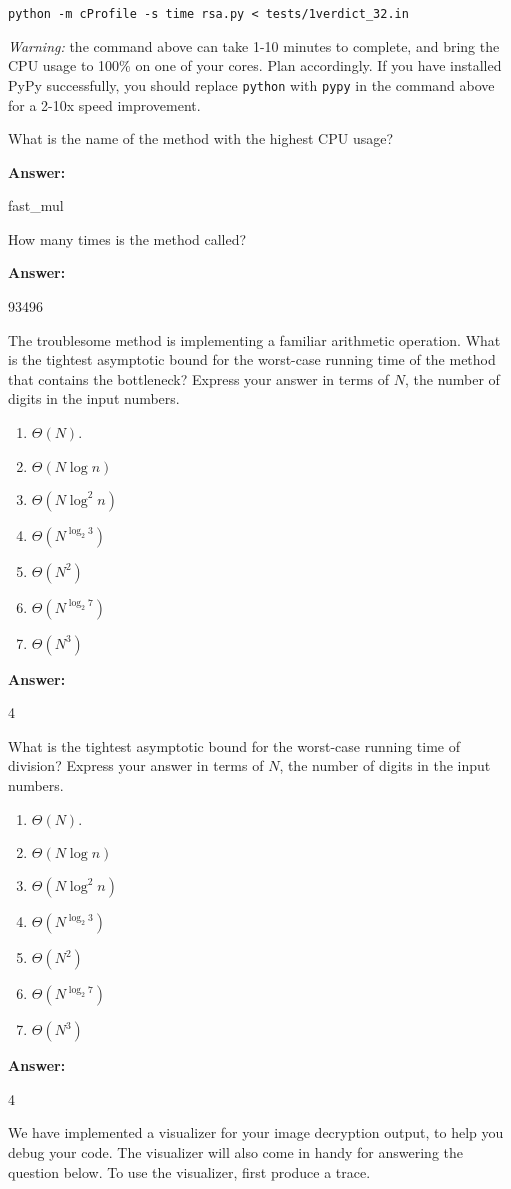 \documentclass[12pt,twoside]{article}
\newcommand{\answer}{
 \par\medskip
 \textbf{Answer:}
}
\newcommand{\answerIIIa}{ \answer 
fast_mul
}
\newcommand{\answerIIIb}{ \answer
93496
}
\newcommand{\answerIIIc}{ \answer
4
}
\newcommand{\answerIIId}{ \answer
4
}
\begin{document}
\begin{problems}
\begin{problemparts}
\texttt{python -m cProfile -s time rsa.py < tests/1verdict\_32.in}

\textit{Warning:} the command above can take 1-10 minutes to complete, and
bring the CPU usage to 100\% on one of your cores. Plan accordingly. If
you have installed PyPy successfully, you should replace \texttt{python} with
\texttt{pypy} in the command above for a 2-10x speed improvement. 

What is the name of the method with the highest CPU usage?
\answerIIIa

\problempart {} How many times is the method called?
\answerIIIb

\problempart {} The troublesome method is implementing a familiar
arithmetic operation. What is the tightest asymptotic bound for the worst-case
running time of the method that contains the bottleneck? Express your answer in
terms of $N$, the number of digits in the input numbers.
\begin{enumerate}
  \item $\Theta(N)$.
  \item $\Theta(N \log n)$
  \item $\Theta(N \log^2 n)$
  \item $\Theta(N^{\log_{2} 3})$
  \item $\Theta(N^2)$
  \item $\Theta(N^{\log_{2} 7})$
  \item $\Theta(N^3)$
\end{enumerate}
\answerIIIc

\problempart {} What is the tightest asymptotic bound for the worst-case
running time of division? Express your answer in terms of $N$, the number of
digits in the input numbers.
\begin{enumerate}
  \item $\Theta(N)$.
  \item $\Theta(N \log n)$
  \item $\Theta(N \log^2 n)$
  \item $\Theta(N^{\log_{2} 3})$
  \item $\Theta(N^2)$
  \item $\Theta(N^{\log_{2} 7})$
  \item $\Theta(N^3)$
\end{enumerate}
\answerIIId

\end{problemparts}

We have implemented a visualizer for your image decryption output, to help you
debug your code. The visualizer will also come in handy for answering the
question below. To use the visualizer, first produce a trace.


\end{problems}
\end{document}

